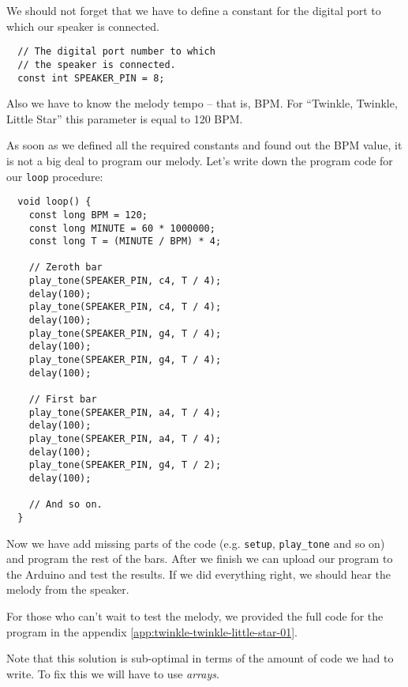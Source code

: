 \documentclass[../sparc.tex]{subfiles}
\begin{document}
We should not forget that we have to define a constant for the digital port to
which our speaker is connected.

\begin{verbatim}
  // The digital port number to which
  // the speaker is connected.
  const int SPEAKER_PIN = 8;
\end{verbatim}

Also we have to know the melody tempo -- that is, \gls{BPM}.  For ``Twinkle,
Twinkle, Little Star'' this parameter is equal to 120 BPM.

As soon as we defined all the required constants and found out the BPM value, it
is not a big deal to program our melody.  Let's write down the program code for
our \texttt{loop} procedure:

\begin{verbatim}
  void loop() {
    const long BPM = 120;
    const long MINUTE = 60 * 1000000;
    const long T = (MINUTE / BPM) * 4;

    // Zeroth bar
    play_tone(SPEAKER_PIN, c4, T / 4);
    delay(100);
    play_tone(SPEAKER_PIN, c4, T / 4);
    delay(100);
    play_tone(SPEAKER_PIN, g4, T / 4);
    delay(100);
    play_tone(SPEAKER_PIN, g4, T / 4);
    delay(100);

    // First bar
    play_tone(SPEAKER_PIN, a4, T / 4);
    delay(100);
    play_tone(SPEAKER_PIN, a4, T / 4);
    delay(100);
    play_tone(SPEAKER_PIN, g4, T / 2);
    delay(100);

    // And so on.
  }
\end{verbatim}

Now we have add missing parts of the code (e.g. \texttt{setup},
\texttt{play\_tone} and so on) and program the rest of the bars.  After we
finish we can upload our program to the Arduino and test the results.  If we did
everything right, we should hear the melody from the speaker.

For those who can't wait to test the melody, we provided the full code for the
program in the appendix \ref{app:twinkle-twinkle-little-star-01}.

Note that this solution is sub-optimal in terms of the amount of code we had to
write.  To fix this we will have to use \emph{arrays}.
\end{document}
